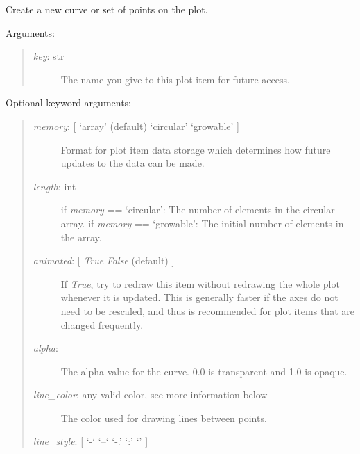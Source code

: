 \documentclass[letterpaper,10pt,english]{sphinxmanual}
\begin{document}
\begin{fulllineitems}
\begin{fulllineitems}
\end{fulllineitems}


\begin{fulllineitems}
\label{api:mpl.Plot2D.new_curve}
Create a new curve or set of points on the plot.

Arguments:
\begin{quote}
\begin{description}
\item[{\emph{key}: str}] \leavevmode
The name you give to this plot item for future access.

\end{description}
\end{quote}

Optional keyword arguments:
\begin{quote}
\begin{description}
\item[{\emph{memory}: {[} `array' (default) \textbar{} `circular' \textbar{} `growable' {]}}] \leavevmode
Format for plot item data storage which determines how future updates 
to the data can be made.

\item[{\emph{length}: int}] \leavevmode
if \emph{memory} == `circular': The number of elements in the circular array.
if \emph{memory} == `growable': The initial number of elements in the array.

\item[{\emph{animated}: {[} \emph{True} \textbar{} \emph{False} (default) {]}}] \leavevmode
If \emph{True}, try to redraw this item without redrawing the whole plot
whenever it is updated. This is generally faster if the axes do not
need to be rescaled, and thus is recommended for plot items that 
are changed frequently.

\item[{\emph{alpha}: }] \leavevmode
The alpha value for the curve. 0.0 is transparent and 1.0 is opaque.

\item[{\emph{line\_color}: any valid color, see more information below}] \leavevmode
The color used for drawing lines between points.

\end{description}

\emph{line\_style}: {[} `-` \textbar{} `--` \textbar{} `-.' \textbar{} `:' \textbar{} `' {]}
\begin{quote}


\end{quote}
\end{quote}
\end{fulllineitems}
\end{fulllineitems}
\end{document}
